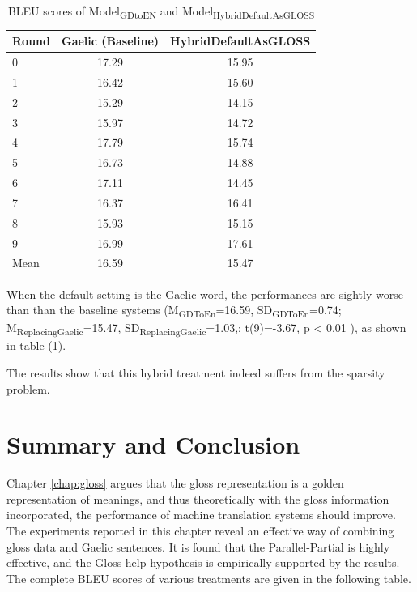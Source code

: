 \documentclass[final]{ua-thesis}
\numberwithin{equation}{section}
\begin{document}
\begin{table}[ht]
\centering
\begin{tabular}{lcc}
  \hline
Round & Gaelic (Baseline) & HybridDefaultAsGLOSS \\ 
  \hline
0 & 17.29 & 15.95 \\ 
  1 & 16.42 & 15.60 \\ 
  2 & 15.29 & 14.15 \\ 
  3 & 15.97 & 14.72 \\ 
  4 & 17.79 & 15.74 \\ 
  5 & 16.73 & 14.88 \\ 
  6 & 17.11 & 14.45 \\ 
  7 & 16.37 & 16.41 \\ 
  8 & 15.93 & 15.15 \\ 
  9 & 16.99 & 17.61 \\ 
   \hline
Mean & 16.59 & 15.47 \\ 
   \hline
\end{tabular}
\caption{BLEU scores of Model\textsubscript{GDtoEN} and Model\textsubscript{HybridDefaultAsGLOSS}} 
\label{Table:HybridDefaultAsGLOSS}
\end{table}When the default setting is the Gaelic word, the performances are sightly worse than than the baseline systems 
(M\textsubscript{GDToEn}=16.59, SD\textsubscript{GDToEn}=0.74; M\textsubscript{ReplacingGaelic}=15.47, SD\textsubscript{ReplacingGaelic}=1.03,; t(9)=-3.67, p < 0.01 ), as shown in table (\ref{Table:HybridDefaultAsGLOSS}).

The results show that this hybrid treatment indeed suffers from the sparsity problem. 

\section{Summary and Conclusion}
Chapter \ref{chap:gloss} argues that the gloss representation is a golden representation of meanings, and thus theoretically with the gloss information incorporated, the performance of machine translation systems should improve. The experiments reported in this chapter reveal an effective way of combining gloss data and Gaelic sentences. It is found that the Parallel-Partial is highly effective, and the Gloss-help hypothesis is empirically supported by the results. 
The complete BLEU scores of various treatments are given in the following table.
\end{document}

